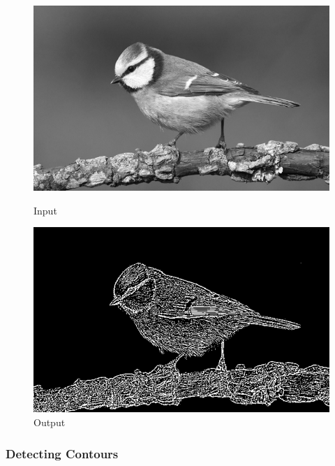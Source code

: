 \begin{figure}[htb]
    \centering
    \begin{minipage}[t]{0.45\linewidth}
        \centering
        \includegraphics[width=\linewidth]{pics/bildverarbeitungsalgos/grayscaling_output.png}
        \caption{Input}
        \label{maai:thresholding:input:thrid}
    \end{minipage}
    \hfill
    \begin{minipage}[t]{0.45\linewidth}
        \centering
        \includegraphics[width=\linewidth]{pics/bildverarbeitungsalgos/gaussian_thresholding.png}
        \caption{Output}
        \label{maai:gaussianthresholding:output}
    \end{minipage}
\end{figure}

\subsubsection{Detecting Contours}

